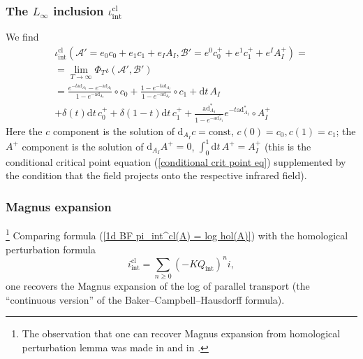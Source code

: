 \documentclass{amsart}
\theoremstyle{plain} %
\theoremstyle{definition}
\theoremstyle{remark}
\newtheorem{rem}[thm]{Remark}
\newcommand{\mr}{\mathrm}
\newcommand{\ra}{\rightarrow}
\newcommand{\ad}{\mathrm{ad}}
\newcommand{\ii}{\mathrm{int}}
\newcommand{\cl}{\mathrm{cl}}
\newcommand{\A}{\mathcal{A}}
\newcommand{\B}{\mathcal{B}}
\newcommand{\dr}{\mathrm{d}}
\begin{document}
\subsubsection{The $L_\infty$ inclusion $\iota^\cl_\ii$} 
We find
\begin{multline}\label{1d BF iota_int^cl}
    \iota_\ii^\cl(\A'=e_0c_0+ e_1 c_1+ e_I A_I, \B'=e^0c^+_0+e^1 c^+_1+ e^I A^+_I)=\\
    =\lim_{T\ra \infty} \Phi_T \iota(\A',\B')\\
    =
    \frac{e^{-t \ad_{A_I}}-e^{-\ad_{A_I}}}{1-e^{-\ad_{A_I}}}\circ c_0+
     \frac{1-e^{-t \ad_{A_I}}}{1-e^{-\ad_{A_I}}}\circ c_1 + \dr t\, A_I\\
     +
     \delta(t)\dr t\, c^+_0 + \delta(1-t)\dr t\, c^+_1 +
     \frac{\ad^*_{A_I}}{1-e^{-\ad^*_{A_I}}} e^{-t \ad^*_{A_I}}\circ A^+_I
\end{multline}
Here the $c$ component is the solution of $\dr_{A_I}c=\mr{const}$, $c(0)=c_0, c(1)=c_1$; 
the $A^+$ component is the solution of $\dr_{A_I}A^+=0$, $\int_0^1 \dr t \, A^+= A^+_I$ (this is the conditional critical point equation (\ref{conditional crit point eq}) supplemented by the condition that the field projects onto the respective infrared field). %


\subsubsection{Magnus expansion}\!\!\!\footnote{The observation that one can recover Magnus expansion from homological perturbation lemma was made in \cite{BS} and in \cite{MPIM_interns}.}
    Comparing formula (\ref{1d BF pi_int^cl(A) = log hol(A)}) with the homological perturbation formula 
    \begin{equation}\label{1d BF i_int^cl HPL}
      i^\cl_\ii= \sum_{n\geq 0}(- K Q_\ii)^n i,  
    \end{equation}
     one recovers the Magnus expansion of the log of parallel transport (the ``continuous version'' of the Baker--Campbell--Hausdorff formula).
\end{document}
